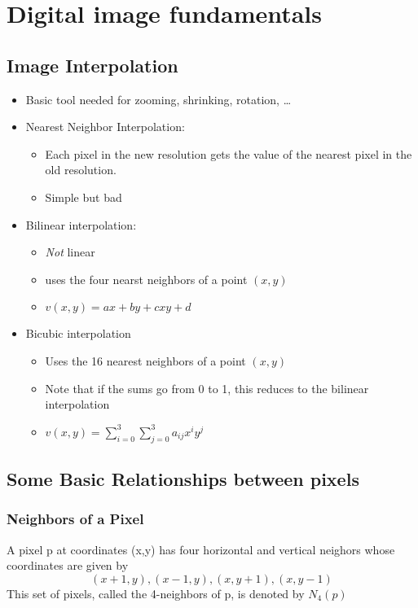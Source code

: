 \section{Digital image fundamentals }
\subsection{Image Interpolation}
\begin{itemize}
  \item Basic tool needed for zooming, shrinking, rotation, \ldots
  \item Nearest Neighbor Interpolation: 
	  \begin{itemize}
		  \item Each pixel in the new resolution gets the value of the nearest pixel in the old resolution.
		  \item Simple but bad
	\end{itemize}
  \item Bilinear interpolation:
  	\begin{itemize}
		\item \emph{Not} linear
  	  \item uses the four nearst neighbors of a point $(x,y)$
  	  \item $v(x,y) = ax + by + cxy + d$
  	\end{itemize}
  \item Bicubic interpolation
	\begin{itemize}
  	  \item Uses the 16 nearest neighbors of a point $(x,y)$
  	  \item Note that if the sums go from 0 to 1, this reduces to the bilinear interpolation
  	  \item $v(x,y) = \sum\limits_{i=0}^3\sum\limits_{j=0}^3 a_{ij}x^iy^j$
  	\end{itemize}
\end{itemize}


\subsection{Some Basic Relationships between pixels}
\subsubsection{Neighbors of a Pixel}
A pixel p at coordinates (x,y) has four horizontal and vertical neighors whose coordinates are given by
\[
	(x+1, y), (x-1, y), (x, y+1), (x, y-1)
\]
This set of pixels, called the 4-neighbors of p, is denoted by $N_4(p)$

